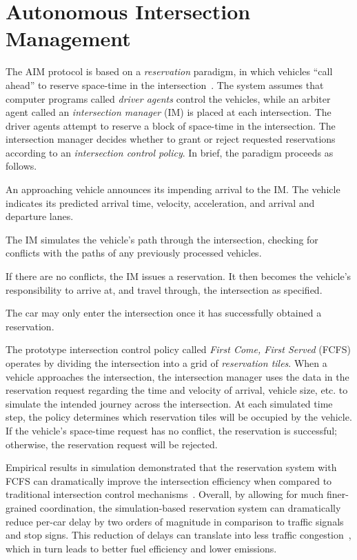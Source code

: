 \section{Autonomous Intersection Management}
\label{sec:aim}

The AIM protocol is based on a \emph{reservation} paradigm, in which
vehicles ``call ahead'' to reserve space-time in the
intersection~\cite{bib:Dresner08Multiagent}. The system assumes that
computer programs called \emph{driver agents} control the vehicles,
while an arbiter agent called an \emph{intersection manager} (IM) is
placed at each intersection.  The driver agents attempt to reserve a
block of space-time in the intersection.  The intersection manager
decides whether to grant or reject requested reservations according to
an \emph{intersection control policy}.  In brief, the paradigm
proceeds as follows.
\begin{small_ind_s_itemize}
\item An approaching vehicle announces its impending arrival to the
IM.  The vehicle indicates its predicted arrival time, velocity,
acceleration, and arrival and departure lanes.
\item The IM simulates the vehicle's path through
the intersection, checking for conflicts with the paths of any
previously processed vehicles.
\item If there are no conflicts, the IM issues a
reservation. It then becomes the vehicle's responsibility to arrive at, and
travel through, the intersection as specified.
\item The car may only enter the intersection once it has successfully
obtained a reservation.
\end{small_ind_s_itemize}
The prototype intersection control policy called \emph{First Come,
First Served} (FCFS) operates by dividing the intersection into a grid
of \emph{reservation tiles}. When a vehicle approaches the
intersection, the intersection manager uses the data in the
reservation request regarding the time and velocity of arrival,
vehicle size, etc. to simulate the intended journey across the
intersection.  At each simulated time step, the policy determines
which reservation tiles will be occupied by the vehicle.  If the
vehicle's space-time request has no conflict, the reservation is
successful; otherwise, the reservation request will be rejected.

Empirical results in simulation demonstrated that the 
reservation system with FCFS can dramatically improve the intersection
efficiency when compared to traditional intersection control
mechanisms~\cite{bib:Dresner08Multiagent}.  Overall, by
allowing for much finer-grained coordination, the simulation-based
reservation system can dramatically reduce per-car delay by two orders
of magnitude in comparison to traffic signals and stop signs.  This
reduction of delays can translate into less traffic
congestion~\cite{bib:Au10Motion,bib:Quinlan10Bringing}, which in turn
leads to better fuel efficiency and lower emissions.

